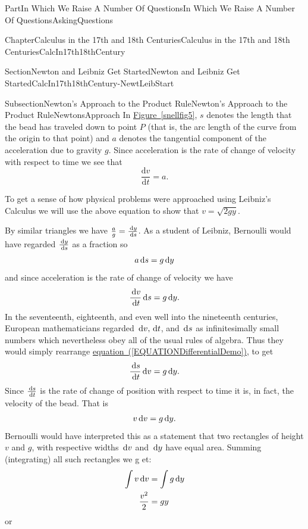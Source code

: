 \documentclass[oneside,10pt,]{book}
\newcommand{\xreffont}{\relax}
\numberwithin{equation}{part}
\newcommand{\dx}[1]{\,{\rm d}#1}
\newcommand{\dfdx}[2]{\frac{\text{d}{#1}}{\text{d}{#2}}}
\newcommand{\amp}{&}
\begin{document}
\begin{partptx}{Part}{In Which We Raise A Number Of Questions}{}{In Which We Raise A Number Of Questions}{}{}{AskingQuestions}
\begin{chapterptx}{Chapter}{Calculus in the 17th and 18th Centuries}{}{Calculus in the 17th and 18th Centuries}{}{}{CalcIn17th18thCentury}
\begin{sectionptx}{Section}{Newton and Leibniz Get Started}{}{Newton and Leibniz Get Started}{}{}{CalcIn17th18thCentury-NewtLeibStart}
\begin{subsectionptx}{Subsection}{Newton's Approach to the Product Rule}{}{Newton's Approach to the Product Rule}{}{}{NewtonsApproach}
In \hyperref[snellfig5]{Figure~{\xreffont\ref{snellfig5}}}, \(s\) denotes the length that the bead has traveled down to point \(P\) (that is, the arc length of the curve from the origin to that point) and \(a\) denotes the tangential component of the acceleration due to gravity \(g\).  Since  acceleration is the rate of change of velocity with respect to time we see that%
\begin{equation*}
\dfdx{v}{t}=a\text{.}
\end{equation*}
%
\par
To get a sense of how physical problems were approached using Leibniz's Calculus we will use the above equation to show that \(v=\sqrt{2gy}\).%
\par
By similar triangles we have \(\frac{a}{g}=\frac{\dx{ y}}{\dx{ s}}\). As a student of Leibniz, Bernoulli would have regarded \(\frac{\dx{ y}}{\dx{ s}}\) as a fraction so%
\begin{equation*}
a\dx{s}  = g\dx{y}
\end{equation*}
and since acceleration is the rate of change of velocity we have%
\begin{equation}
\frac{\dx{ v}}{\dx{ t}}\dx{ s}  = g\dx{ y}\text{.}\label{EQUATIONDifferentialDemo}
\end{equation}
In the seventeenth, eighteenth, and even well into the nineteenth centuries, European mathematicians regarded \(\dx{ v}, \dx{ t}\), and \(\dx{ s}\) as infinitesimally small numbers which nevertheless obey all of the usual rules of algebra. Thus they would simply  rearrange \hyperref[EQUATIONDifferentialDemo]{equation~({\xreffont\ref{EQUATIONDifferentialDemo}})},  to get%
\begin{equation*}
\frac{\dx{s}}{\dx{t}}\dx{ v}  = g\dx{y}\text{.}
\end{equation*}
Since \(\frac{\dx{ s}}{\dx{ t}}\) is the rate of change of position with respect to time it is, in fact, the velocity of the bead. That is%
\begin{equation*}
v\dx{ v}  = g\dx{ y}\text{.}
\end{equation*}
Bernoulli would have interpreted this as a statement that two rectangles of height \(v\) and \(g\), with respective widths \(\dx{ v}\) and \(\dx{ y}\) have equal area. Summing (integrating) all such rectangles we g et:%
\begin{align*}
\int{}v\dx{ v} \amp = \int{}g\dx{ y}\\
\frac{v^2}{2} \amp = gy
\end{align*}
or%
\begin{equation}

\end{equation}
\end{subsectionptx}
\end{sectionptx}
\end{chapterptx}
\end{partptx}
\end{document}
